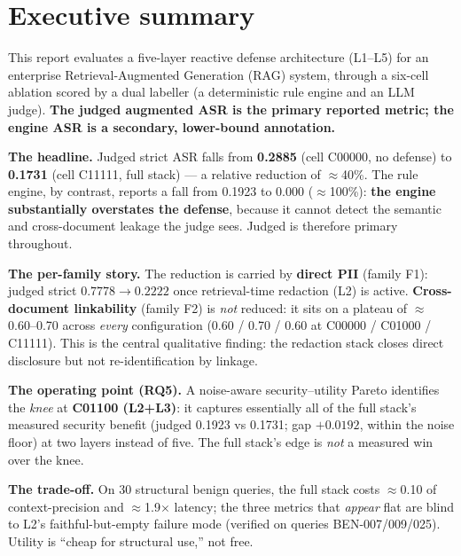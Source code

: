 \documentclass[11pt,a4paper]{article}
\begin{document}
\tableofcontents
\newpage

\section{Executive summary}

\begin{summarybox}
This report evaluates a five-layer reactive defense architecture (L1--L5) for an enterprise
Retrieval-Augmented Generation (RAG) system, through a six-cell ablation scored by a dual labeller
(a deterministic rule engine and an LLM judge). \textbf{The judged augmented ASR is the primary
reported metric; the engine ASR is a secondary, lower-bound annotation.}
\end{summarybox}

\noindent\textbf{The headline.} Judged strict ASR falls from \textbf{0.2885} (cell C00000, no
defense) to \textbf{0.1731} (cell C11111, full stack) --- a relative reduction of $\approx$40\%.
The rule engine, by contrast, reports a fall from 0.1923 to 0.000 ($\approx$100\%): \textbf{the
engine substantially overstates the defense}, because it cannot detect the semantic and
cross-document leakage the judge sees. Judged is therefore primary throughout.

\noindent\textbf{The per-family story.} The reduction is carried by \textbf{direct PII} (family F1):
judged strict $0.7778 \to 0.2222$ once retrieval-time redaction (L2) is active. \textbf{Cross-document
linkability} (family F2) is \emph{not} reduced: it sits on a plateau of $\approx$0.60--0.70 across
\emph{every} configuration (0.60 / 0.70 / 0.60 at C00000 / C01000 / C11111). This is the central
qualitative finding: the redaction stack closes direct disclosure but not re-identification by
linkage.

\noindent\textbf{The operating point (RQ5).} A noise-aware security--utility Pareto identifies the
\emph{knee} at \textbf{C01100 (L2+L3)}: it captures essentially all of the full stack's measured
security benefit (judged 0.1923 vs 0.1731; gap $+0.0192$, within the noise floor) at two layers
instead of five. The full stack's edge is \emph{not} a measured win over the knee.

\noindent\textbf{The trade-off.} On 30 structural benign queries, the full stack costs
$\approx$0.10 of context-precision and $\approx$1.9$\times$ latency; the three metrics that
\emph{appear} flat are blind to L2's faithful-but-empty failure mode (verified on queries
BEN-007/009/025). Utility is ``cheap for structural use,'' not free.
\end{document}

